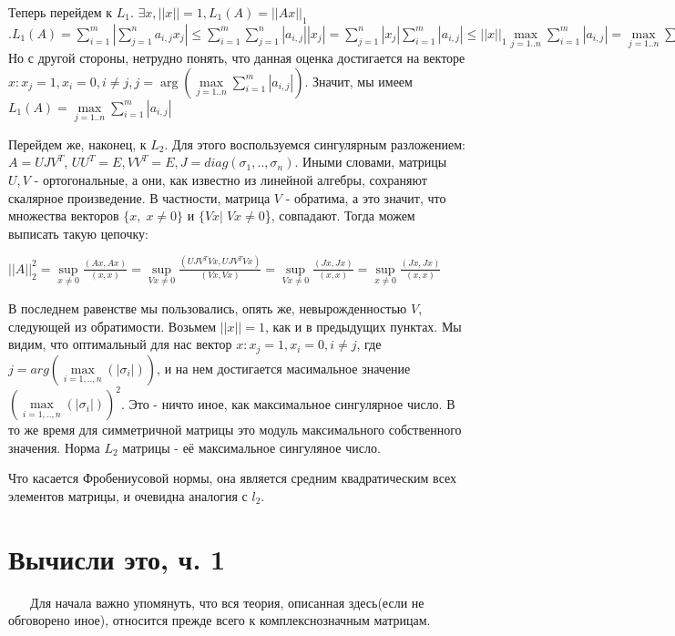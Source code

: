 \documentclass{article}
\begin{document}
Теперь перейдем к $L_1$.  $\exists x, ||x|| = 1, L_1(A) = ||Ax||_1$
$.
L_{1}(A) = \sum\limits_{i = 1}^{m} \left| \sum\limits_{j = 1}^{n} a_{i, j}x_j \right|
\leq
\sum\limits_{i = 1}^{m} \sum\limits_{j = 1}^{n} |a_{i, j}| |x_j|
=
\sum\limits_{j = 1}^{n} |x_j| \sum\limits_{i = 1}^{m} |a_{i, j}|
\leq
||x||_1 \max\limits_{j = 1 .. n} \sum\limits_{i = 1}^{m} |a_{i, j}|
=
\max\limits_{j = 1 .. n} \sum\limits_{i = 1}^{m}  |a_{i, j}|
$ \\

Но с другой стороны, нетрудно понять, что данная оценка достигается на векторе 
$x: x_j = 1, x_i = 0, i \neq j, j = \arg(\max\limits_{j = 1 .. n} \sum\limits_{i = 1}^{m} |a_{i, j}|)$. Значит, мы имеем $L_{1}(A) = \max\limits_{j = 1 .. n} \sum\limits_{i = 1}^{m}  |a_{i, j}|$

Перейдем же, наконец, к $L_2$. Для этого воспользуемся сингулярным разложением: $A = UJV^{T}$, $UU^{T} = E, VV^{T} = E, J = diag(\sigma_1, .. , \sigma_n)$. Иными словами, матрицы  $U, V$ - ортогональные, а они, как известно из линейной алгебры, сохраняют скалярное произведение. В частности, матрица $V$ - обратима, а это значит, что множества векторов $\{x,\; x \neq 0\}$ и $\{Vx | \; Vx \neq 0$\}, совпадают. Тогда можем выписать такую цепочку:

$||A||^2_2 = \sup\limits_{x \neq 0} \frac{(Ax, Ax)}{(x, x)} = 
 \sup\limits_{Vx \neq 0} \frac{(UJV^TVx, UJV^TVx)}{(Vx, Vx)} =
 \sup\limits_{Vx \neq 0} \frac{(Jx, Jx)}{(x, x)} =
 \sup\limits_{x \neq 0} \frac{(Jx, Jx)}{(x, x)}$
 
В последнем равенстве мы пользовались, опять же, невырожденностью $V$, следующей из обратимости. Возьмем $||x|| = 1$, как и в предыдущих пунктах. Мы видим, что оптимальный для нас вектор $x: x_j = 1, x_i = 0, i \neq j $, где $ j = arg(\max\limits_{i = 1, .., n}(|\sigma_i|))$, и на нем достигается масимальное значение $(\max\limits_{i = 1, .., n}(|\sigma_i|))^2$. Это - ничто иное, как максимальное сингулярное число. В то же время для симметричной матрицы это модуль максимального собственного значения. Норма $L_2$ матрицы - её максимальное сингуляное число.

Что касается Фробениусовой нормы, она является средним квадратическим всех элементов матрицы, и очевидна аналогия с $l_2$.

\section{Вычисли это, ч. 1} 

 $\; \; \; \; \;$ Для начала важно упомянуть, что вся теория, описанная здесь(если не обговорено иное), относится прежде всего к комплекснозначным матрицам. 
\end{document}
